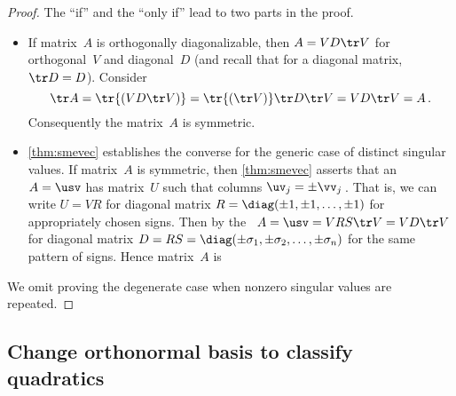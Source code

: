 \begin{proof} 
The ``if'' and the ``only if'' lead to two parts in the proof.
\begin{itemize}
\item If matrix~\(A\) is orthogonally diagonalizable, then \(A=VD\tr V\) for orthogonal~\(V\) and diagonal~\(D\) (and recall that for a diagonal matrix, \(\tr D=D\)).
Consider
\begin{equation*}
\tr A=\tr{(VD\tr V)}
=\tr{(\tr V)}\tr D\tr V
=VD\tr V=A\,.
\end{equation*}
Consequently the matrix~\(A\) is symmetric.

\item \cref{thm:smevec} establishes the converse for the generic case of distinct singular values.
If matrix~\(A\) is symmetric, then \cref{thm:smevec} asserts that an \svd\ \(A=\usv\) has matrix~\(U\) such that columns \(\uv_j=\pm\vv_j\)\,.
That is, we can write \(U=VR\) for diagonal matrix \(R=\diag(\pm1,\pm1,\ldots,\pm1)\) for appropriately chosen signs.
Then by the \svd\ \(A=\usv=VRS\tr V=VD\tr V\) for diagonal matrix \(D=RS=\diag(\pm\sigma_1,\pm\sigma_2,\ldots,\pm\sigma_n)\) for the same pattern of signs.
Hence matrix~\(A\) is 
\end{itemize}
We omit proving the degenerate case when nonzero singular values are repeated.
\end{proof}

\begin{comment}
Further material could include the following---maybe exercises.
For every \idx{symmetric matrix}, \(A^k=VD^k\tr V\).
Also, every \idx{square matrix} has a \idx{polar decomposition} \(A=RQ\) for symmetric positive semi-definite~\(R\) and orthogonal~\(Q\) (since \(A=\usv=(US\tr U)(U\tr V)\)) \pooliv{p.610}.  
\cite{Higham86} mentions applications to the Orthogonal Procrustes problem (perhaps in approx matrices), Aerospace, Optimization, Matrix square-root, but these look too hard for this level.
\end{comment}









\subsection{Change orthonormal basis to classify quadratics}
\label{sec:cobcqs}

